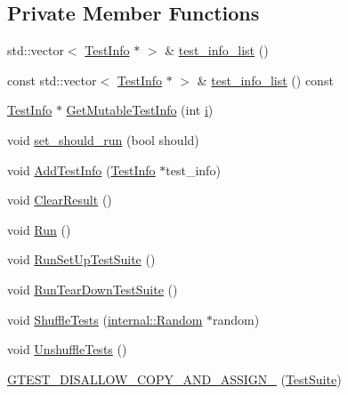\subsection*{Private Member Functions}
\begin{DoxyCompactItemize}
\item 
std\+::vector$<$ \mbox{\hyperlink{classtesting_1_1_test_info}{Test\+Info}} $\ast$ $>$ \& \mbox{\hyperlink{classtesting_1_1_test_suite_a9aae5da520bc0f25d67c948c0a5fa6b6}{test\+\_\+info\+\_\+list}} ()
\item 
const std\+::vector$<$ \mbox{\hyperlink{classtesting_1_1_test_info}{Test\+Info}} $\ast$ $>$ \& \mbox{\hyperlink{classtesting_1_1_test_suite_aad784d4e25767e359e6bae1ef4196404}{test\+\_\+info\+\_\+list}} () const
\item 
\mbox{\hyperlink{classtesting_1_1_test_info}{Test\+Info}} $\ast$ \mbox{\hyperlink{classtesting_1_1_test_suite_a8d95ac13939d4e89987cf6cbf57b0b46}{Get\+Mutable\+Test\+Info}} (int \mbox{\hyperlink{_obj__test_2lib_2googletest-master_2googlemock_2test_2gmock-matchers__test_8cc_acb559820d9ca11295b4500f179ef6392}{i}})
\item 
void \mbox{\hyperlink{classtesting_1_1_test_suite_a783c072998fdbdfd600221823cea1de1}{set\+\_\+should\+\_\+run}} (bool should)
\item 
void \mbox{\hyperlink{classtesting_1_1_test_suite_a9d8d94a589481923b7cf6c7ce3a48f8b}{Add\+Test\+Info}} (\mbox{\hyperlink{classtesting_1_1_test_info}{Test\+Info}} $\ast$test\+\_\+info)
\item 
void \mbox{\hyperlink{classtesting_1_1_test_suite_a87bb26673c51e952e4904afcfa418c51}{Clear\+Result}} ()
\item 
void \mbox{\hyperlink{classtesting_1_1_test_suite_a16c6fb9e056f1d9113ca1e6eaf9b58bc}{Run}} ()
\item 
void \mbox{\hyperlink{classtesting_1_1_test_suite_a366c17f4d7a8c9130bfa2fc37d316e8b}{Run\+Set\+Up\+Test\+Suite}} ()
\item 
void \mbox{\hyperlink{classtesting_1_1_test_suite_adde3df6963a73760cfb53bbf69f47f29}{Run\+Tear\+Down\+Test\+Suite}} ()
\item 
void \mbox{\hyperlink{classtesting_1_1_test_suite_ab5c2055e93f43a2029e36adc5d75347a}{Shuffle\+Tests}} (\mbox{\hyperlink{classtesting_1_1internal_1_1_random}{internal\+::\+Random}} $\ast$random)
\item 
void \mbox{\hyperlink{classtesting_1_1_test_suite_afcf87bf5cf6bc373a286c0258ff39f8d}{Unshuffle\+Tests}} ()
\item 
\mbox{\hyperlink{classtesting_1_1_test_suite_a4b3b080cb92343fbd1611b621d63bbe9}{G\+T\+E\+S\+T\+\_\+\+D\+I\+S\+A\+L\+L\+O\+W\+\_\+\+C\+O\+P\+Y\+\_\+\+A\+N\+D\+\_\+\+A\+S\+S\+I\+G\+N\+\_\+}} (\mbox{\hyperlink{classtesting_1_1_test_suite}{Test\+Suite}})

\end{DoxyCompactItemize}
